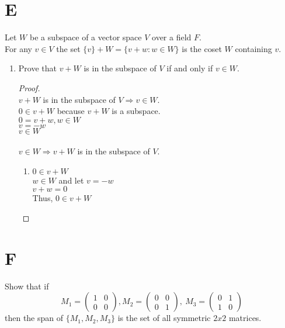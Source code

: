 \documentclass[11pt]{scrartcl}
\begin{document}
\section{E}
Let $W$ be a subspace of a vector space $V$ over a field $F$.\\
For any $v \in V$ the set $\{v\} + W = \{v + w : w \in W \}$ is the coset $W$ containing $v$.
\begin{enumerate}[label=\alph*.]
	\item{
		Prove that $v + W$ is in the subspace of $V$ if and only if $v \in W$.
		\begin{proof}
			\-\\
			$v + W$ is in the subspace of $V \Rightarrow v \in W$.\\
			$0 \in v + W$ because $v + W$ is a subspace.\\
			$0 = v + w, w \in W$\\
			$v = -w$\\
			$v \in W$\\ 
			\-\\
			$v \in W \Rightarrow v + W$ is in the subspace of $V$.
			\begin{enumerate}
		\item{
			$0 \in v + W$\\
			$w \in W$ and let $v = -w$\\
			$v + w = 0$\\
			Thus, $0 \in v + W$
			}

		\end{enumerate}
		\end{proof}
	}
\end{enumerate}

\section{F}
Show that if 
\[
M_1 = 
\begin{pmatrix}
1 & 0 \\
0 & 0 
\end{pmatrix},
M_2 = 
\begin{pmatrix}
0 & 0 \\
0 & 1 
\end{pmatrix},
\
M_3 = 
\begin{pmatrix}
0 & 1 \\
1 & 0 
\end{pmatrix}
\]
then the span of $\{M_1, M_2, M_3\}$ is the set of all symmetric $2x2$ matrices.
\end{document}
